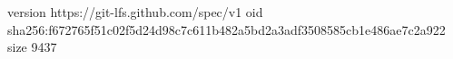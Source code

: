 version https://git-lfs.github.com/spec/v1
oid sha256:f672765f51c02f5d24d98c7c611b482a5bd2a3adf3508585cb1e486ae7c2a922
size 9437
